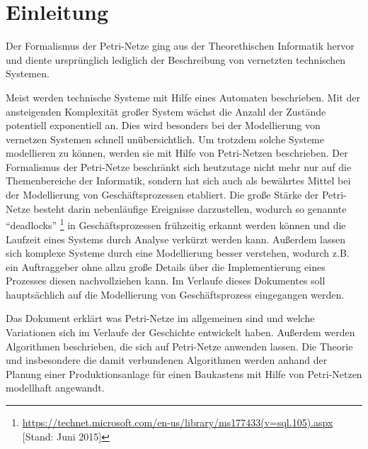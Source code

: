 
\chapter{Einleitung}
Der Formalismus der Petri-Netze ging aus der Theorethischen Informatik hervor
und diente ursprünglich lediglich der Beschreibung von vernetzten technischen Systemen.

Meist werden technische Systeme mit Hilfe eines Automaten beschrieben.
Mit der ansteigenden Komplexität großer System wächst die Anzahl der Zustände potentiell exponentiell an.
Dies wird besonders bei der Modellierung von vernetzen Systemen schnell unübersichtlich.
Um trotzdem solche Systeme modellieren zu können, werden sie mit Hilfe von Petri-Netzen beschrieben.
Der Formalismus der Petri-Netze beschränkt sich heutzutage nicht mehr nur auf die Themenbereiche der Informatik,
sondern hat sich auch als bewährtes Mittel bei der Modellierung von Geschäftsprozessen etabliert.
Die große Stärke der Petri-Netze besteht darin nebenläufige Ereignisse darzustellen,
wodurch so genannte \enquote{deadlocks} \footnote{\url{https://technet.microsoft.com/en-us/library/ms177433(v=sql.105).aspx} [Stand: Juni 2015]}
in Geschäftsprozessen frühzeitig erkannt werden können und
die Laufzeit eines Systems durch Analyse verkürzt werden kann.
Außerdem lassen sich komplexe Systeme durch eine Modellierung besser verstehen,
wodurch z.B. ein Auftraggeber ohne allzu große Details über die Implementierung eines Prozesses
diesen nachvollziehen kann.
Im Verlaufe dieses Dokumentes soll hauptsächlich auf die Modellierung von Geschäftsprozess eingegangen werden.

Das Dokument erklärt was Petri-Netze im allgemeinen sind und
welche Variationen sich im Verlaufe der Geschichte entwickelt haben.
Außerdem werden Algorithmen beschrieben, die sich auf Petri-Netze anwenden lassen.
Die Theorie und insbesondere die damit verbundenen Algorithmen
werden anhand der Planung einer Produktionsanlage für einen Baukastens
mit Hilfe von Petri-Netzen modellhaft angewandt.
\newpage


